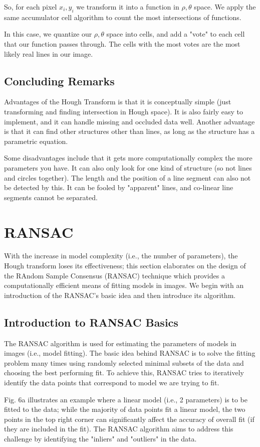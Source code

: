 \documentclass{article}
\begin{document}
So, for each pixel $x_i, y_i$ we transform it into a function in  $\rho, \theta$ space. We apply the same accumulator cell algorithm to count the most intersections of functions.

In this case, we quantize our $\rho, \theta$ space into cells, and add a "vote" to each cell that our function passes through. The cells with the most votes are the most likely real lines in our image.

\subsection{Concluding Remarks}
Advantages of the Hough Transform is that it is conceptually simple (just transforming and finding intersection in Hough space). It is also fairly easy to implement, and it can handle missing and occluded data well. Another advantage is that it can find other structures other than lines, as long as the structure has a parametric equation.

Some disadvantages include that it gets more computationally complex the more parameters you have. It can also only look for one kind of structure (so not lines and circles together). The length and the position of a line segment can also not be detected by this. It can be fooled by "apparent" lines, and co-linear line segments cannot be separated.
\section{RANSAC}
With the increase in model complexity (i.e., the number of parameters), the Hough transform loses its effectiveness; this section elaborates on the design of the RAndom Sample Consensus (RANSAC) technique \cite{fischler1981random} which provides a computationally efficient means of fitting models in images. We begin with an introduction of the RANSAC's basic idea and then introduce its algorithm.
\subsection{Introduction to RANSAC Basics}
The RANSAC algorithm is used for estimating the parameters of models in images (i.e., model fitting). The basic idea behind RANSAC is to solve the fitting problem many times using randomly selected minimal subsets of the data and choosing the best performing fit. To achieve this, RANSAC tries to iteratively identify the data points that correspond to model we are trying to fit.

Fig. 6a illustrates an example where a linear model (i.e., 2 parameters) is to be fitted to the data; while the majority of data points fit a linear model, the two points in the top right corner can significantly affect the accuracy of overall fit (if they are included in the fit). The RANSAC algorithm aims to address this challenge by identifying the "inliers" and "outliers" in the data.
\end{document}
